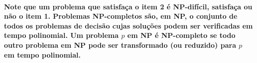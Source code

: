 \documentclass[a4paper,10pt]{article}
\theoremstyle{plain}
\begin{document}
\paragraph{
  Note que um problema que satisfaça o item 2 é NP-difícil, satisfaça ou não o item 1. Problemas
  NP-completos são, em NP, o conjunto de todos os problemas de decisão cujas soluções podem ser
  verificadas em tempo polinomial. Um problema $p$ em NP é NP-completo se todo outro problema em NP
  pode ser transformado (ou reduzido) para $p$ em tempo polinomial.
}

\newpage

\printbibliography
\end{document}
